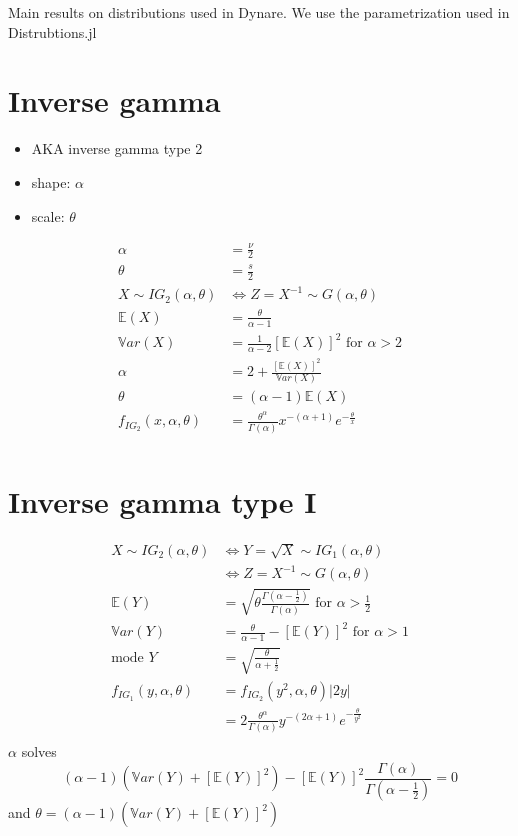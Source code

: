 \documentclass{article}
\begin{document}
Main results on distributions used in Dynare. We use the
parametrization used in Distrubtions.jl

\section{Inverse gamma}
\begin{itemize}
\item AKA inverse gamma type 2
\item shape: $\alpha$
\item scale: $\theta$
\end{itemize}
\begin{align*}
\alpha &= \frac{\nu}{2}\\
\theta &= \frac{s}{2}\\
X \sim IG_2(\alpha, \theta) &\Leftrightarrow Z = X^{-1} \sim G(\alpha, \theta)\\
\mathbb{E}(X) &= \frac{\theta}{\alpha - 1}\\
\mathbb{V}ar(X) &= \frac{1}{\alpha - 2}[\mathbb{E}(X)]^2 \mbox{ for
                  }\alpha > 2\\
  \alpha &= 2+\frac{[\mathbb{E}(X)]^2}{\mathbb{V}ar(X)}\\
  \theta &= (\alpha - 1)\mathbb{E}(X)\\
f_{IG_2}(x, \alpha, \theta) &=
                      \frac{\theta^\alpha}{\Gamma(\alpha)}x^{-(\alpha+1)}e^{-\frac{\theta}{x}}\\
\end{align*}

\section{Inverse gamma type I}
\begin{align*}
  X \sim IG_2(\alpha, \theta) &\Leftrightarrow Y = \sqrt{X} \sim IG_1(\alpha, \theta)\\
                              & \Leftrightarrow Z = X^{-1} \sim G(\alpha, \theta)\\
\mathbb{E}(Y) &= \sqrt{\theta\frac{\Gamma(\alpha-\frac{1}{2})}{\Gamma(\alpha)}} \mbox{ for }\alpha > \frac{1}{2} \\
\mathbb{V}ar(Y) &= \frac{\theta}{\alpha - 1} - [\mathbb{E}(Y)]^2 \mbox{ for }\alpha > 1\\
\mbox{mode }Y &= \sqrt{\frac{\theta}{\alpha + \frac{1}{2}}}\\
  f_{IG_1}(y, \alpha, \theta) &= f_{IG_2}(y^2, \alpha, \theta)|2y|\\
  &= 2\frac{\theta^\alpha}{\Gamma(\alpha)}y^{-(2\alpha+1)}e^{-\frac{\theta}{y^2}}\\
\end{align*}
$\alpha$ solves
\[
(\alpha - 1)\left(\mathbb{V}ar(Y) + [\mathbb{E}(Y)]^2\right)-
\left[\mathbb{E}(Y)\right]^2\frac{\Gamma(\alpha)}{\Gamma(\alpha-\frac{1}{2})} =0
\]
and $\theta = (\alpha - 1)(\mathbb{V}ar(Y) + [\mathbb{E}(Y)]^2)$
\end{document}
